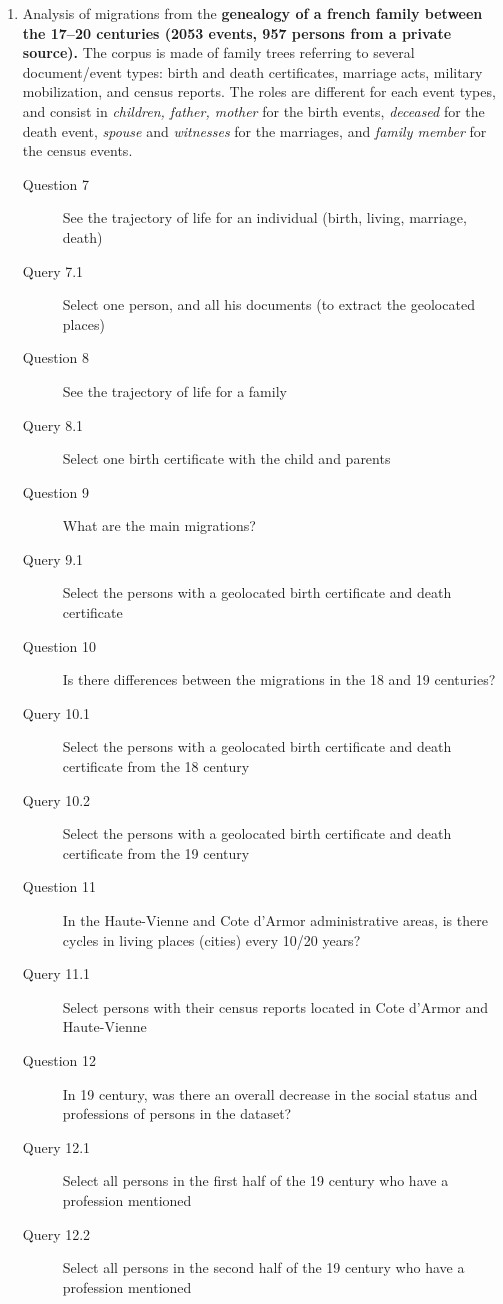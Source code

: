 \begin{enumerate}
    \item Analysis of migrations from the \textbf{genealogy of a french family between the 17--20 centuries (2053 events, 957 persons from a private source).}
    The corpus is made of family trees referring to several document/event types: birth and death certificates, marriage acts, military mobilization, and census reports. The roles are different for each event types, and consist in \textit{children, father, mother} for the birth events, \textit{deceased} for the death event, \textit{spouse} and \textit{witnesses} for the marriages, and \textit{family member} for the census events.
    \begin{small}
        \begin{description}
            \item[Question 7] See the trajectory of life for an individual (birth, living, marriage, death)
            \item[\myindent Query 7.1] Select one person, and all his documents (to extract the geolocated places)
            \item[Question 8] See the trajectory of life for a family
            \item[\myindent Query 8.1] Select one birth certificate with the child and parents
            \item[Question 9] What are the main migrations?
            \item[\myindent Query 9.1] Select the persons with a geolocated birth certificate and death certificate
            \item[Question 10] Is there differences between the migrations in the 18 and 19 centuries?
            \item[\myindent Query 10.1] Select the persons with a geolocated birth certificate and death certificate from the 18 century
            \item[\myindent Query 10.2] Select the persons with a geolocated birth certificate and death certificate from the 19 century
            \item[Question 11] In the Haute-Vienne and Cote d'Armor administrative areas, is there cycles in living places (cities) every 10/20 years?
            \item[\myindent Query 11.1] Select persons with their census reports located in Cote d’Armor and Haute-Vienne
            \item[Question 12] In 19 century, was there an overall decrease in the social status and professions of persons in the dataset?
            \item[\myindent Query 12.1] Select all persons in the first half of the 19 century who have a profession mentioned
            \item[\myindent Query 12.2] Select all persons in the second half of the 19 century who have a profession mentioned
        \end{description}
    \end{small}


\end{enumerate}
